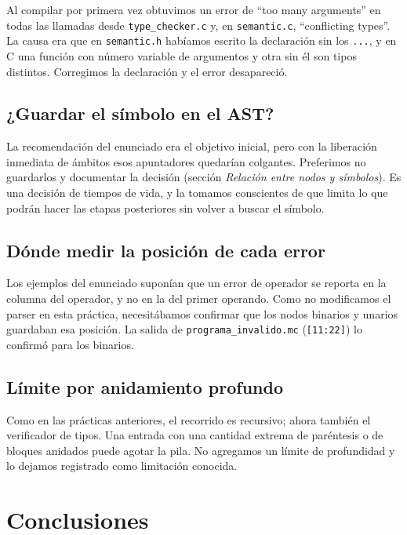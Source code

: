 \documentclass[12pt,letterpaper]{article}
\begin{document}
Al compilar por primera vez obtuvimos un error de ``too many arguments'' en todas las llamadas desde
\texttt{type\_checker.c} y, en \texttt{semantic.c}, ``conflicting types''. La causa era que en
\texttt{semantic.h} habíamos escrito la declaración sin los \texttt{...}, y en C una función con número
variable de argumentos y otra sin él son tipos distintos. Corregimos la declaración y el error desapareció.

\subsection*{¿Guardar el símbolo en el AST?}

La recomendación del enunciado era el objetivo inicial, pero con la liberación inmediata de ámbitos esos
apuntadores quedarían colgantes. Preferimos no guardarlos y documentar la decisión
(sección \emph{Relación entre nodos y símbolos}). Es una decisión de tiempos de vida, y la tomamos conscientes
de que limita lo que podrán hacer las etapas posteriores sin volver a buscar el símbolo.

\subsection*{Dónde medir la posición de cada error}

Los ejemplos del enunciado suponían que un error de operador se reporta en la columna del operador, y no en
la del primer operando. Como no modificamos el parser en esta práctica, necesitábamos confirmar que los nodos
binarios y unarios guardaban esa posición. La salida de \texttt{programa\_invalido.mc} (\texttt{[11:22]}) lo
confirmó para los binarios.

\subsection*{Límite por anidamiento profundo}

Como en las prácticas anteriores, el recorrido es recursivo; ahora también el verificador de tipos. Una entrada
con una cantidad extrema de paréntesis o de bloques anidados puede agotar la pila. No agregamos un límite de
profundidad y lo dejamos registrado como limitación conocida.

\section*{Conclusiones}
\end{document}
